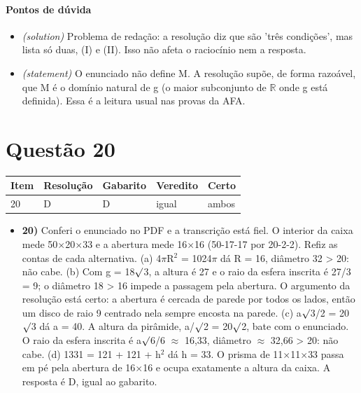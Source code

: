 \documentclass{article}%
\begin{document}
\paragraph{Pontos de dúvida}%
\begin{itemize}%
\item%
\textit{(solution)} Problema de redação: a resolução diz que são 'três condições', mas lista só duas, (I) e (II). Isso não afeta o raciocínio nem a resposta.%
\item%
\textit{(statement)} O enunciado não define M. A resolução supõe, de forma razoável, que M é o domínio natural de g (o maior subconjunto de $\mathbb{R}$ onde g está definida). Essa é a leitura usual nas provas da AFA.%
\end{itemize}%
\section*{Questão 20}%
\begin{longtable}{@{}p{} p{} p{} p{} p{}@{}}\toprule Item & Resolução & Gabarito & Veredito & Certo \\ \midrule
20 & D & D & igual & ambos \\
\bottomrule\end{longtable}%
\begin{itemize}%
\item%
\textbf{20)} Conferi o enunciado no PDF e a transcrição está fiel. O interior da caixa mede 50$\times$20$\times$33 e a abertura mede 16$\times$16 (50-17-17 por 20-2-2). Refiz as contas de cada alternativa. (a) 4$\pi$R$^2$ = 1024$\pi$ dá R = 16, diâmetro 32 > 20: não cabe. (b) Com g = 18$\surd$3, a altura é 27 e o raio da esfera inscrita é 27/3 = 9; o diâmetro 18 > 16 impede a passagem pela abertura. O argumento da resolução está certo: a abertura é cercada de parede por todos os lados, então um disco de raio 9 centrado nela sempre encosta na parede. (c) a$\surd$3/2 = 20$\surd$3 dá a = 40. A altura da pirâmide, a/$\surd$2 = 20$\surd$2, bate com o enunciado. O raio da esfera inscrita é a$\surd$6/6 $\approx$ 16,33, diâmetro $\approx$ 32,66 > 20: não cabe. (d) 1331 = 121 + 121 + h$^2$ dá h = 33. O prisma de 11$\times$11$\times$33 passa em pé pela abertura de 16$\times$16 e ocupa exatamente a altura da caixa. A resposta é D, igual ao gabarito.%
\end{itemize}%
\end{document}
